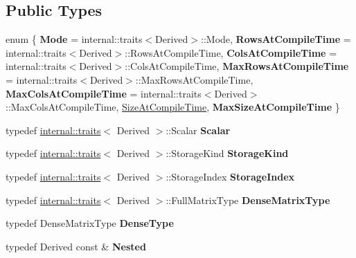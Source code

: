 \subsection*{Public Types}
\begin{DoxyCompactItemize}
\item 
enum \{ \newline
{\bfseries Mode} = internal\+::traits$<$Derived$>$\+::Mode, 
{\bfseries Rows\+At\+Compile\+Time} = internal\+::traits$<$Derived$>$\+::Rows\+At\+Compile\+Time, 
{\bfseries Cols\+At\+Compile\+Time} = internal\+::traits$<$Derived$>$\+::Cols\+At\+Compile\+Time, 
{\bfseries Max\+Rows\+At\+Compile\+Time} = internal\+::traits$<$Derived$>$\+::Max\+Rows\+At\+Compile\+Time, 
\newline
{\bfseries Max\+Cols\+At\+Compile\+Time} = internal\+::traits$<$Derived$>$\+::Max\+Cols\+At\+Compile\+Time, 
\mbox{\hyperlink{class_eigen_1_1_triangular_base_a2530a08c81539f645aee0c25aaf0f8a3a41d03efb5f764a9e647974c83581ca0e}{Size\+At\+Compile\+Time}}, 
{\bfseries Max\+Size\+At\+Compile\+Time}
 \}
\item 
\mbox{\label{class_eigen_1_1_triangular_base_a66a300711dd3f1a3c5e76cf5371c6cd8}} 
typedef \mbox{\hyperlink{struct_eigen_1_1internal_1_1traits}{internal\+::traits}}$<$ Derived $>$\+::Scalar {\bfseries Scalar}
\item 
\mbox{\label{class_eigen_1_1_triangular_base_a11a793d02d96bbf60b21d9ba50f2c903}} 
typedef \mbox{\hyperlink{struct_eigen_1_1internal_1_1traits}{internal\+::traits}}$<$ Derived $>$\+::Storage\+Kind {\bfseries Storage\+Kind}
\item 
\mbox{\label{class_eigen_1_1_triangular_base_a72aec51bb5da83e4763583b0111752b3}} 
typedef \mbox{\hyperlink{struct_eigen_1_1internal_1_1traits}{internal\+::traits}}$<$ Derived $>$\+::Storage\+Index {\bfseries Storage\+Index}
\item 
\mbox{\label{class_eigen_1_1_triangular_base_a6a58f381cffe7c4ee285add36403ac6a}} 
typedef \mbox{\hyperlink{struct_eigen_1_1internal_1_1traits}{internal\+::traits}}$<$ Derived $>$\+::Full\+Matrix\+Type {\bfseries Dense\+Matrix\+Type}
\item 
\mbox{\label{class_eigen_1_1_triangular_base_ac8cb785868547eff2d002f4175539131}} 
typedef Dense\+Matrix\+Type {\bfseries Dense\+Type}
\item 
\mbox{\label{class_eigen_1_1_triangular_base_a436c0051fb2e0a4522ce7b08479e422d}} 
typedef Derived const  \& {\bfseries Nested}
\end{DoxyCompactItemize}
